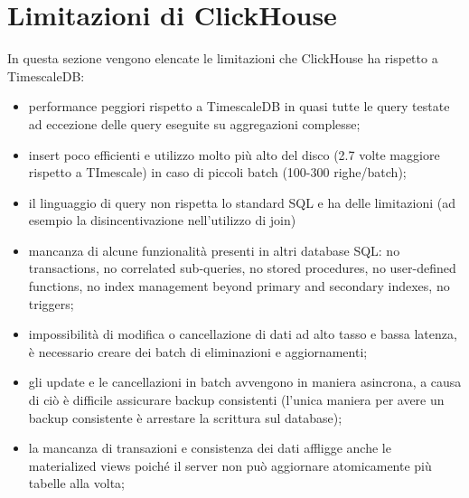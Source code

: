 \section{Limitazioni di ClickHouse}
In questa sezione vengono elencate le limitazioni che ClickHouse ha rispetto a TimescaleDB: 
\begin{itemize}
	\item performance peggiori rispetto a TimescaleDB in quasi tutte le query testate ad eccezione delle query eseguite su aggregazioni complesse;
	\item insert poco efficienti e utilizzo molto più alto del disco (2.7 volte maggiore rispetto a TImescale) in caso di  piccoli batch (100-300 righe/batch);
	\item il linguaggio di query non rispetta lo standard SQL e ha delle limitazioni (ad esempio la disincentivazione nell’utilizzo di join)
	\item mancanza di alcune funzionalità presenti in altri database SQL: no transactions, no correlated sub-queries, no stored procedures, no user-defined functions, no index management beyond primary and secondary indexes, no triggers; 
	\item impossibilità di modifica o cancellazione di dati ad alto tasso e bassa latenza, è necessario creare dei batch di eliminazioni e aggiornamenti;
	\item gli update e le cancellazioni in batch avvengono in maniera asincrona, a causa di ciò è difficile assicurare backup consistenti (l’unica maniera per avere un backup consistente è arrestare la scrittura sul database);
	\item la mancanza di transazioni e consistenza dei dati affligge anche le materialized views poiché il server non può aggiornare atomicamente più tabelle alla volta;
\end{itemize}
















